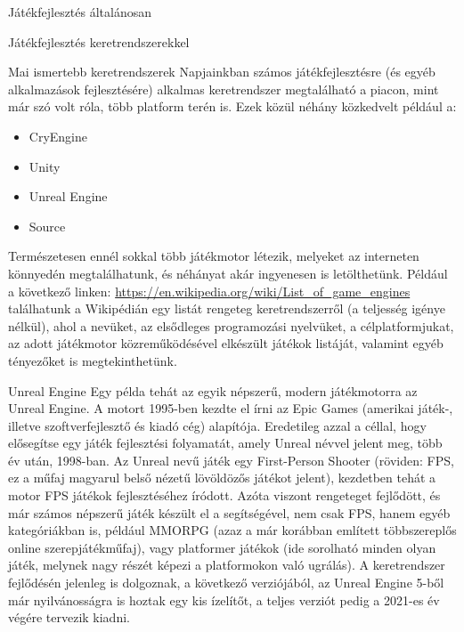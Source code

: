 \begin{MyChapter}{Játékfejlesztés általánosan}
\begin{MySection}{Játékfejlesztés keretrendszerekkel}
		\begin{MySubSection}{Mai ismertebb keretrendszerek}
		Napjainkban számos játékfejlesztésre (és egyéb alkalmazások fejlesztésére) alkalmas keretrendszer megtalálható a piacon, mint már szó volt róla, több platform terén is.
		Ezek közül néhány közkedvelt például a:
		\begin{itemize}
			\item CryEngine
			\item Unity
			\item Unreal Engine
			\item Source
		\end{itemize}
		Természetesen ennél sokkal több játékmotor létezik, melyeket az interneten könnyedén megtalálhatunk, és néhányat akár ingyenesen is letölthetünk.
		Például a következő linken: \url{https://en.wikipedia.org/wiki/List\_of\_game\_engines} találhatunk a Wikipédián egy listát rengeteg keretrendszerről (a teljesség igénye nélkül), ahol a nevüket, az elsődleges programozási nyelvüket, a célplatformjukat, az adott játékmotor közreműködésével elkészült játékok listáját, valamint egyéb tényezőket is megtekinthetünk.
		\end{MySubSection}
		
		\begin{MySubSection}{Unreal Engine}
		Egy példa tehát az egyik népszerű, modern játékmotorra az Unreal Engine. A motort 1995-ben kezdte el írni az Epic Games (amerikai játék-, illetve szoftverfejlesztő és kiadó cég) alapítója. Eredetileg azzal a céllal, hogy elősegítse egy játék fejlesztési folyamatát, amely Unreal névvel jelent meg, több év után, 1998-ban. Az Unreal nevű játék egy First-Person Shooter (röviden: FPS, ez a műfaj magyarul belső nézetű lövöldözős játékot jelent), kezdetben tehát a motor FPS játékok fejlesztéséhez íródott. Azóta viszont rengeteget fejlődött, és már számos népszerű játék készült el a segítségével, nem csak FPS, hanem egyéb kategóriákban is, például MMORPG (azaz a már korábban említett többszereplős online szerepjátékműfaj), vagy platformer játékok (ide sorolható minden olyan játék, melynek nagy részét képezi a platformokon való ugrálás). A keretrendszer fejlődésén jelenleg is dolgoznak, a következő verziójából, az Unreal Engine 5-ből már nyilvánosságra is hoztak egy kis ízelítőt, a teljes verziót pedig a 2021-es év végére tervezik kiadni.
		

\end{MySubSection}
\end{MySection}
\end{MyChapter}
